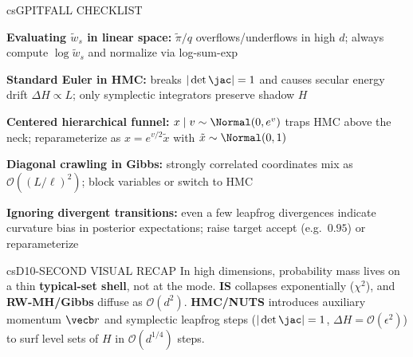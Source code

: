 \documentclass[../../../../master.tex]{subfiles}
\begin{document}
\begin{cscolumns}
\begin{cscard}{csG}{PITFALL CHECKLIST}
  \begin{csbul}
    \item \textbf{Evaluating $\tilde w_s$ in linear space:} $\tilde\pi/q$ overflows/underflows in high $d$; always compute $\log\tilde w_s$ and normalize via log-sum-exp
    \item \textbf{Standard Euler in HMC:} breaks $|\det\jac|=1$ and causes secular energy drift $\Delta H\propto L$; only symplectic integrators preserve shadow $H$
    \item \textbf{Centered hierarchical funnel:} $x\mid v\sim\Normal(0,e^v)$ traps HMC above the neck; reparameterize as $x=e^{v/2}\tilde x$ with $\tilde x\sim\Normal(0,1)$
    \item \textbf{Diagonal crawling in Gibbs:} strongly correlated coordinates mix as $\mathcal O((L/\ell)^2)$; block variables or switch to HMC
    \item \textbf{Ignoring divergent transitions:} even a few leapfrog divergences indicate curvature bias in posterior expectations; raise target accept (e.g.\ $0.95$) or reparameterize
  \end{csbul}
\end{cscard}

\begin{cscard}{csD}{10-SECOND VISUAL RECAP}
  \sffamily\footnotesize
  In high dimensions, probability mass lives on a thin \textbf{typical-set shell}, not at the mode.
  \textbf{IS} collapses exponentially ($\chi^2$), and \textbf{RW-MH/Gibbs} diffuse as $\mathcal O(d^2)$.
  \textbf{HMC/NUTS} introduces auxiliary momentum $\vecb r$ and symplectic leapfrog steps ($|\det\jac|=1$, $\Delta H=\mathcal O(\epsilon^2)$) to surf level sets of $H$ in $\mathcal O(d^{1/4})$ steps.
\end{cscard}
\end{cscolumns}

\csend
\end{document}
